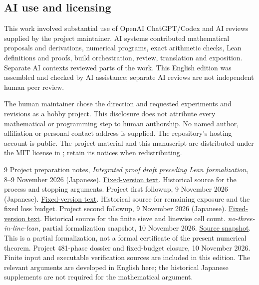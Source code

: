 \subsection{AI use and licensing}
This work involved substantial use of OpenAI ChatGPT/Codex and AI reviews
supplied by the project maintainer. AI systems contributed mathematical
proposals and derivations, numerical programs, exact arithmetic checks,
Lean definitions and proofs, build orchestration, review, translation
and exposition. Separate AI contexts reviewed parts of the work. This
English edition was assembled and checked by AI assistance; separate
AI reviews are not independent human peer review.

The human maintainer chose the direction and requested experiments and
revisions as a hobby project. This disclosure does not attribute every
mathematical or programming step to human authorship. No named author,
affiliation or personal contact address is supplied. The repository's
hosting account is public. The project material and this manuscript
are distributed under the MIT license in ; retain its
notices when redistributing.

\begin{thebibliography}{9}
Project preparation notes, \emph{Integrated proof draft preceding
Lean formalization}, 8--9 November 2026 (Japanese).
\href{https://github.com/agolkjaoi/no-three-in-line-lean/blob/282b636c160d049e3ef4d82f619fd44d98f8cf1d/docs/research-notes/preparation/PROOF_FOR_LEAN_JA.txt}{Fixed-version text}.
Historical source for the process and stopping arguments.
Project first followup, 9 November 2026 (Japanese).
\href{https://github.com/agolkjaoi/no-three-in-line-lean/blob/282b636c160d049e3ef4d82f619fd44d98f8cf1d/docs/research-notes/first-followup/FOLLOWUP_FOR_REVIEW_JA.txt}{Fixed-version text}.
Historical source for remaining exposure and the fixed loss budget.
Project second followup, 9 November 2026 (Japanese).
\href{https://github.com/agolkjaoi/no-three-in-line-lean/blob/282b636c160d049e3ef4d82f619fd44d98f8cf1d/docs/research-notes/second-followup/SECOND_FOLLOWUP_FOR_REVIEW_JA.txt}{Fixed-version text}.
Historical source for the finite sieve and linewise cell count.
\emph{no-three-in-line-lean}, partial formalization snapshot, 10 November 2026.
\href{https://github.com/agolkjaoi/no-three-in-line-lean/tree/282b636c160d049e3ef4d82f619fd44d98f8cf1d}{Source snapshot}.
This is a partial formalization, not a formal certificate of the present
numerical theorem.
Project 481-phase dossier and fixed-budget closure, 10 November 2026.
Finite input and executable verification sources are included in this
edition. The relevant arguments are developed in English here; the
historical Japanese supplements are not required for the mathematical
argument.
\end{thebibliography}
